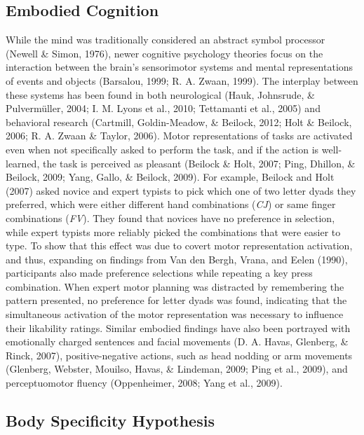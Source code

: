 \documentclass[english,man]{apa6}
\theoremstyle{definition}
\theoremstyle{definition}
\theoremstyle{definition}
\theoremstyle{remark}
\begin{document}
\subsection{Embodied Cognition}\label{embodied-cognition}

While the mind was traditionally considered an abstract symbol processor
(Newell \& Simon, 1976), newer cognitive psychology theories focus on
the interaction between the brain's sensorimotor systems and mental
representations of events and objects (Barsalou, 1999; R. A. Zwaan,
1999). The interplay between these systems has been found in both
neurological (Hauk, Johnsrude, \& Pulvermüller, 2004; I. M. Lyons et
al., 2010; Tettamanti et al., 2005) and behavioral research (Cartmill,
Goldin-Meadow, \& Beilock, 2012; Holt \& Beilock, 2006; R. A. Zwaan \&
Taylor, 2006). Motor representations of tasks are activated even when
not specifically asked to perform the task, and if the action is
well-learned, the task is perceived as pleasant (Beilock \& Holt, 2007;
Ping, Dhillon, \& Beilock, 2009; Yang, Gallo, \& Beilock, 2009). For
example, Beilock and Holt (2007) asked novice and expert typists to pick
which one of two letter dyads they preferred, which were either
different hand combinations (\emph{CJ}) or same finger combinations
(\emph{FV}). They found that novices have no preference in selection,
while expert typists more reliably picked the combinations that were
easier to type. To show that this effect was due to covert motor
representation activation, and thus, expanding on findings from Van den
Bergh, Vrana, and Eelen (1990), participants also made preference
selections while repeating a key press combination. When expert motor
planning was distracted by remembering the pattern presented, no
preference for letter dyads was found, indicating that the simultaneous
activation of the motor representation was necessary to influence their
likability ratings. Similar embodied findings have also been portrayed
with emotionally charged sentences and facial movements (D. A. Havas,
Glenberg, \& Rinck, 2007), positive-negative actions, such as head
nodding or arm movements (Glenberg, Webster, Mouilso, Havas, \&
Lindeman, 2009; Ping et al., 2009), and perceptuomotor fluency
(Oppenheimer, 2008; Yang et al., 2009).

\subsection{Body Specificity
Hypothesis}\label{body-specificity-hypothesis}
\end{document}
